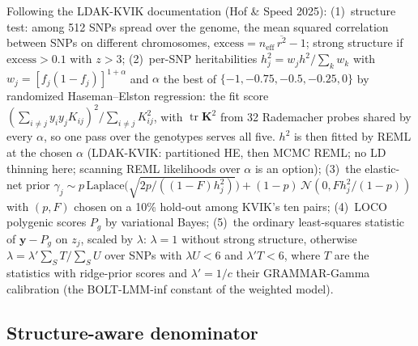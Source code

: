 \documentclass[11pt]{article}
\newcommand{\y}{\mathbf{y}}
\newcommand{\K}{\mathbf{K}}
\newcommand{\tr}{\operatorname{tr}}
\begin{document}
Following the LDAK-KVIK documentation (Hof \& Speed 2025):
(1)~structure test: among 512 SNPs spread over the genome, the mean
squared correlation between SNPs on different chromosomes,
$\mathrm{excess} = n_{\mathrm{eff}}\,\overline{r^2} - 1$; strong
structure if $\mathrm{excess} > 0.1$ with $z > 3$;
(2)~per-SNP heritabilities $h_j^2 = w_j h^2/\sum_k w_k$ with
$w_j = [f_j(1-f_j)]^{1+\alpha}$ and $\alpha$ the best of
$\{-1, -0.75, -0.5, -0.25, 0\}$ by randomized Haseman--Elston regression:
the fit score $(\sum_{i\ne j} y_iy_jK_{ij})^2/\sum_{i\ne j}K_{ij}^2$, with
$\tr \K^2$ from 32 Rademacher probes shared by every $\alpha$, so one pass
over the genotypes serves all five. $h^2$ is then fitted by REML at the
chosen $\alpha$ (LDAK-KVIK: partitioned HE, then MCMC REML; no LD thinning
here; scanning REML likelihoods over $\alpha$ is an option);
(3)~the elastic-net prior
$\gamma_j \sim p\,\mathrm{Laplace}\big(\sqrt{2p/((1-F)h_j^2)}\big) + (1-p)\,\mathcal{N}(0, F h_j^2/(1-p))$
with $(p, F)$ chosen on a 10\% hold-out among KVIK's ten pairs;
(4)~LOCO polygenic scores $P_g$ by variational Bayes; (5)~the ordinary
least-squares statistic of $\y - P_g$ on $z_j$, scaled by $\lambda$:
$\lambda = 1$ without strong structure, otherwise
$\lambda = \lambda'\sum_S T/\sum_S U$ over SNPs with $\lambda U < 6$ and
$\lambda' T < 6$, where $T$ are the statistics with ridge-prior scores
and $\lambda' = 1/c$ their GRAMMAR-Gamma calibration (the BOLT-LMM-inf
constant of the weighted model).

\subsection{Structure-aware denominator}
\label{sec:spectral}
\end{document}
